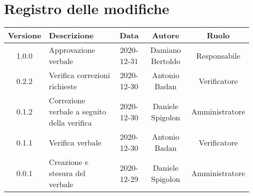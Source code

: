 \section*{Registro delle modifiche}

\begin{center}
	\begin{longtable}{|c|p{5cm}|c|c|c|}
	\hline
	\rowcolor{lighter-grayer}
	\textbf{Versione} & \textbf{Descrizione} & \textbf{Data} & \textbf{Autore} & \textbf{Ruolo} \\
	\hline
	\endfirsthead

	1.0.0 & Approvazione verbale & 2020-12-31 & Damiano Bertoldo & Responsabile \\
	\hline
	0.2.2 & Verifica correzioni richieste & 2020-12-30 & Antonio Badan & Verificatore \\
	\hline
	0.1.2 & Correzione verbale a seguito della verifica & 2020-12-30 & Daniele Spigolon & Amministratore \\
	\hline
	0.1.1 & Verifica verbale & 2020-12-30 & Antonio Badan & Verificatore \\
	\hline
	0.0.1 & Creazione e stesura del verbale & 2020-12-29 & Daniele Spigolon & Amministratore \\
	\hline
	\end{longtable}
\end{center}